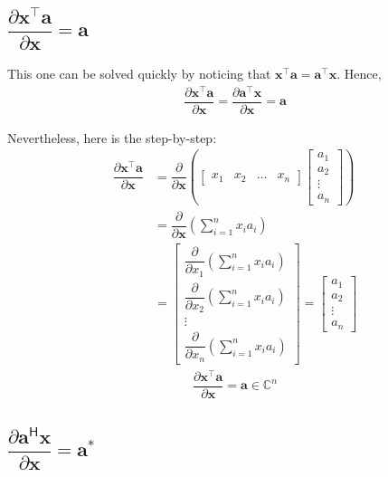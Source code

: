 \documentclass{article}
\newcommand{\trans}{\top}
\newcommand{\hermit}{\mathsf{H}}
\begin{document}
\subsection{\(\dfrac{\partial \mathbf{x}^\trans  \mathbf{a}}{\partial \mathbf{x}} = \mathbf{a}\)}

This one can be solved quickly by noticing that \(\mathbf{x}^\trans  \mathbf{a} = \mathbf{a}^\trans  \mathbf{x}\). Hence,
\begin{align}
    \dfrac{\partial \mathbf{x}^\trans  \mathbf{a}}{\partial \mathbf{x}} = \dfrac{\partial \mathbf{a}^\trans  \mathbf{x}}{\partial \mathbf{x}} = \mathbf{a}
\end{align}

Nevertheless, here is the step-by-step:
\begin{align}
    \dfrac{\partial \mathbf{x}^\trans \mathbf{a}}{\partial \mathbf{x}} &= \dfrac{\partial}{\partial \mathbf{x}} \left(
    \begin{bmatrix}
        x_1 & x_2 & \dots & x_n
    \end{bmatrix} \begin{bmatrix}
        a_{1} \\ a_{2} \\ \vdots \\ a_{n}
    \end{bmatrix} \right) \\
    & = \dfrac{\partial}{\partial \mathbf{x}} \left( \sum_{i = 1}^n x_ia_i \right) \\
    & = \begin{bmatrix}
        \dfrac{\partial}{\partial x_1} \left( \sum_{i = 1}^n x_ia_i \right) \\ \dfrac{\partial}{\partial x_2} \left( \sum_{i = 1}^n x_ia_i \right) \\ \vdots \\ \dfrac{\partial}{\partial x_n} \left( \sum_{i = 1}^n x_ia_i \right) 
    \end{bmatrix} 
    = \begin{bmatrix}
        a_1 \\ a_2 \\ \vdots \\ a_n
    \end{bmatrix}
\end{align}
\begin{align}
    \boxed{\dfrac{\partial \mathbf{x}^\trans \mathbf{a}}{\partial \mathbf{x}} = \mathbf{a} \in \mathbb{C}^{n}}
\end{align}

\subsection{\(\dfrac{\partial \mathbf{a}^\hermit  \mathbf{x}}{\partial \mathbf{x}} = \mathbf{a}^*\)}
\end{document}
